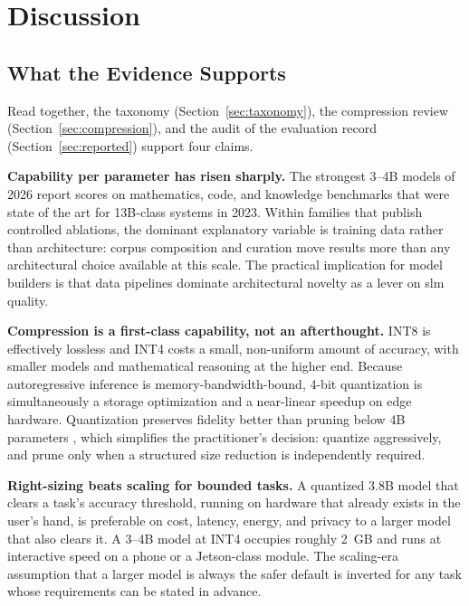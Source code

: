 \section{Discussion}
\label{section:discussion}

\subsection{What the Evidence Supports}
\label{subsec:discussion_key_findings}

Read together, the taxonomy (Section~\ref{sec:taxonomy}), the compression review
(Section~\ref{sec:compression}), and the audit of the evaluation record
(Section~\ref{sec:reported}) support four claims.

\textbf{Capability per parameter has risen sharply.} The strongest 3--4B models
of 2026 report scores on mathematics, code, and knowledge benchmarks that were
state of the art for 13B-class systems in 2023. Within families that publish
controlled ablations, the dominant explanatory variable is training data rather
than architecture: corpus composition and curation move results more than any
architectural choice available at this scale. The practical implication for model
builders is that data pipelines dominate architectural novelty as a lever on
\gls{slm} quality.

\textbf{Compression is a first-class capability, not an afterthought.} INT8 is
effectively lossless and INT4 costs a small, non-uniform amount of accuracy, with
smaller models and mathematical reasoning at the higher end. Because
autoregressive inference is memory-bandwidth-bound, 4-bit quantization is
simultaneously a storage optimization and a near-linear speedup on edge hardware.
Quantization preserves fidelity better than pruning below 4B parameters
\citep{kurz2025pruning_vs_quant}, which simplifies the practitioner's decision:
quantize aggressively, and prune only when a structured size reduction is
independently required.

\textbf{Right-sizing beats scaling for bounded tasks.} A quantized 3.8B model
that clears a task's accuracy threshold, running on hardware that already exists
in the user's hand, is preferable on cost, latency, energy, and privacy to a
larger model that also clears it. A 3--4B model at INT4 occupies roughly 2~GB and
runs at interactive speed on a phone or a Jetson-class module. The scaling-era
assumption that a larger model is always the safer default is inverted for any
task whose requirements can be stated in advance.

